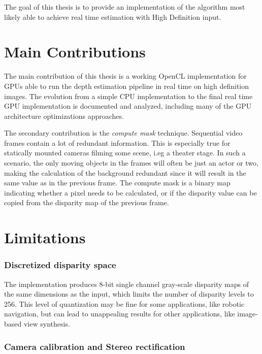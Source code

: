 The goal of this thesis is to provide an implementation of the
algorithm most likely able to achieve real time estimation with High
Definition input.


\section{Main Contributions}\label{sect:contributions}

The main contribution of this thesis is a working OpenCL
implementation for GPUs able to run the depth estimation pipeline in
real time on high definition images. The evolution from a simple CPU
implementation to the final real time GPU implementation is documented
and analyzed, including many of the GPU architecture optimizations
approaches.

The secondary contribution is the \textit{compute mask} technique.
Sequential video frames contain a lot of redundant information. This
is especially true for statically mounted cameras filming some scene,
i.eg a theater stage. In such a scenario, the only moving objects in
the frames will often be just an actor or two, making the calculation
of the background redundant since it will result in the same value as
in the previous frame. The compute mask is a binary map indicating
whether a pixel needs to be calculated, or if the disparity value can
be copied from the disparity map of the previous frame.

\section{Limitations}\label{sect:limitations}

\subsubsection{Discretized disparity space}

The implementation produces 8-bit single channel gray-scale disparity
maps of the same dimensions as the input, which limits the number of
disparity levels to 256. This level of quantization may be fine for
some applications, like robotic navigation, but can lead to
unappealing results for other applications, like image-based view
synthesis.

\subsubsection{Camera calibration and Stereo rectification}

